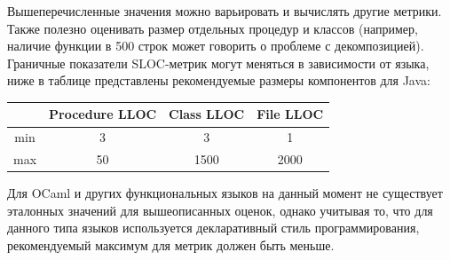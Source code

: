 Вышеперечисленные значения можно варьировать и вычислять другие метрики. Также полезно оценивать размер отдельных процедур и классов (например, наличие функции в 500 строк может говорить о проблеме с декомпозицией). Граничные
показатели SLOC-метрик могут меняться в зависимости от языка, ниже в таблице  представлены рекомендуемые размеры компонентов для Java: 
\begin{center}
\begin{tabular}{ | c | c | c | c | }
\hline
    & Procedure LLOC &  Class LLOC & File LLOC \\ \hline 
min & 3         & 3      & 1 \\  \hline
max & 50        & 1500   & 2000\\ \hline
\end{tabular}
\end{center}

Для OCaml и других функциональных языков на данный момент не существует 
эталонных значений для вышеописанных оценок, однако учитывая то, что для данного типа языков используется декларативный стиль программирования, рекомендуемый максимум для метрик должен быть меньше.
